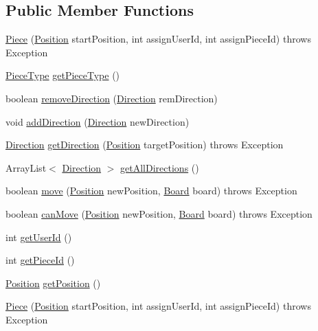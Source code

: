 \subsection*{Public Member Functions}
\begin{DoxyCompactItemize}
\item 
\hyperlink{classPiece_1_1Piece_a997635ad14cc0eb5d3df1b998d05df1d}{Piece} (\hyperlink{classUtil_1_1Position}{Position} start\-Position, int assign\-User\-Id, int assign\-Piece\-Id)  throws Exception 
\item 
\hyperlink{enumPiece_1_1PieceType}{Piece\-Type} \hyperlink{classPiece_1_1Piece_abe02eb4013ec562dfad1056245088add}{get\-Piece\-Type} ()
\item 
boolean \hyperlink{classPiece_1_1Piece_a472ffe2c12ba2a9d2d4a73e38c3f8d7f}{remove\-Direction} (\hyperlink{classUtil_1_1Direction}{Direction} rem\-Direction)
\item 
void \hyperlink{classPiece_1_1Piece_ab292128370c9df7d112cc7972bb8b1d0}{add\-Direction} (\hyperlink{classUtil_1_1Direction}{Direction} new\-Direction)
\item 
\hyperlink{classUtil_1_1Direction}{Direction} \hyperlink{classPiece_1_1Piece_a4068d2bdf5c732c0eee560df93cea966}{get\-Direction} (\hyperlink{classUtil_1_1Position}{Position} target\-Position)  throws Exception 
\item 
Array\-List$<$ \hyperlink{classUtil_1_1Direction}{Direction} $>$ \hyperlink{classPiece_1_1Piece_aee0dc72aed56d9a5c9612d3a9d545672}{get\-All\-Directions} ()
\item 
boolean \hyperlink{classPiece_1_1Piece_a23a749e9ef159a908cb66ddf8575b4a6}{move} (\hyperlink{classUtil_1_1Position}{Position} new\-Position, \hyperlink{classBoard_1_1Board}{Board} board)  throws Exception 
\item 
boolean \hyperlink{classPiece_1_1Piece_ad6d3c365ebdbee1c5a128d5cb645a5c3}{can\-Move} (\hyperlink{classUtil_1_1Position}{Position} new\-Position, \hyperlink{classBoard_1_1Board}{Board} board)  throws Exception 
\item 
int \hyperlink{classPiece_1_1Piece_a39912c2af6e604892dc897105aa511eb}{get\-User\-Id} ()
\item 
int \hyperlink{classPiece_1_1Piece_abb5dd621ae9e76e2aa622a67bf6219b0}{get\-Piece\-Id} ()
\item 
\hyperlink{classUtil_1_1Position}{Position} \hyperlink{classPiece_1_1Piece_a1aa0fc5fa0e9f96c701f7d3b7145560e}{get\-Position} ()
\item 
\hyperlink{classPiece_1_1Piece_a997635ad14cc0eb5d3df1b998d05df1d}{Piece} (\hyperlink{classUtil_1_1Position}{Position} start\-Position, int assign\-User\-Id, int assign\-Piece\-Id)  throws Exception 

\end{DoxyCompactItemize}
